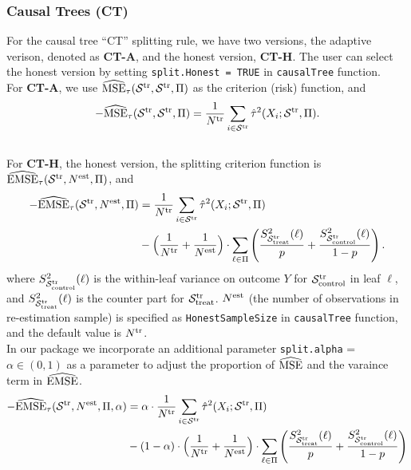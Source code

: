 \documentclass[11pt]{article}
\newcommand{\emse}{{\rm EMSE}}
\newcommand{\est}{{\rm est}}
\newcommand{\calp}{{\Pi}}
\newcommand{\cals}{{\cal S}}
\newcommand{\mse}{{\rm MSE}}
\newcommand{\control}{{\rm control}}
\newcommand{\treat}{{\rm treat}}
\newcommand{\train}{{\rm tr}}
\begin{document}
\subsubsection{Causal Trees (\textbf{CT})}
For the causal tree ``CT'' splitting rule, we have two versions, the adaptive verison, denoted as \textbf{CT-A}, and the honest version, \textbf{CT-H}. The user can select the honest version by setting \texttt{split.Honest = TRUE} in \texttt{causalTree} function. \\
For \textbf{CT-A}, we use $\widehat{\mse}_\tau(\cals^\train,\cals^\train,\calp)$ as the criterion (risk) function, and
\[-\widehat{\mse}_\tau(\cals^\train,\cals^\train,\calp) = \frac{1}{N^\train}\sum_{i\in\cals^\train} \hat\tau^2(X_i;\cals^\train,\calp).\]
\\
For \textbf{CT-H}, the honest version, the splitting criterion function is $\widehat{\emse}_\tau(\cals^\train, N^\est, \calp)$, and
\begin{align*}
-\widehat{\emse}_\tau(\cals^\train, N^\est, \calp) & =
\frac{1}{N^\train}\sum_{i\in\cals^\train} \hat\tau^2(X_i;\cals^\train,\calp) \\
& -
\Bigl(\frac{1}{N^\train} + \frac{1}{N^\est}\Bigr)\cdot \sum_{\ell\in\calp}
\left( \frac{S^2_{\cals^\train_\treat}(\ell)}{p}+ \frac{S^2_{\cals^\train_\control}(\ell)}{1-p}\right).
\end{align*}
where $S^2_{\cals^\train_\control}(\ell)$ is the within-leaf variance on outcome $Y$ for $\cals^\train_\control$ in leaf $\ell$, and $S^2_{\cals^\train_\treat}(\ell)$ is the counter part for $\cals^\train_\treat$. $N^\est$ (the number of observations in re-estimation sample) is specified as \texttt{HonestSampleSize} in \texttt{causalTree} function, and the default value is $N^\train$.\\
In our package we incorporate an additional parameter \texttt{split.alpha} = $\alpha \in (0, 1)$ as a parameter to adjust the proportion of $\widehat{\mse}$ and the varaince term in $\widehat{\emse}$.
\begin{align*}
-\widehat{\emse}_\tau(\cals^\train, N^\est, \calp, \alpha) &=
\alpha \cdot \frac{1}{N^\train}\sum_{i\in\cals^\train} \hat\tau^2(X_i;\cals^\train,\calp) \\
& - (1 - \alpha) \cdot
\Bigl(\frac{1}{N^\train} + \frac{1}{N^\est}\Bigr) \cdot \sum_{\ell\in\calp}
\left( \frac{S^2_{\cals^\train_\treat}(\ell)}{p}+ \frac{S^2_{\cals^\train_\control}(\ell)}{1-p}\right)
\end{align*}
\end{document}
